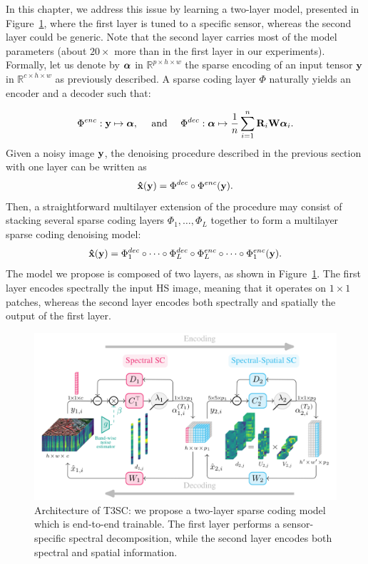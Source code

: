 In this chapter, we address this issue by learning a two-layer model, presented in Figure~\ref{fig:architecture}, where the first layer is tuned to a specific sensor, whereas the second layer could be generic. 
Note that the second layer carries most of the model parameters (about $20\times$ more than in the first layer in our experiments). 
Formally, let us denote by $ {\boldsymbol \alpha}$ in $\mathbb{R}^{p \times h \times w}$ the sparse encoding of an input tensor $\mathbf{y}$ in $\mathbb{R}^{c \times h \times w}$ as previously described.
A sparse coding layer $ \Phi $ naturally yields an encoder and a decoder such that:

\begin{equation}
\Phi^{enc} : \mathbf{y}       \mapsto \mathbf{\boldsymbol \alpha}, ~~~~\text{and}~~~~                  
\Phi^{dec} : \mathbf{\boldsymbol \alpha}  \mapsto \frac{1}{n} \sum_{i=1}^{n} \mathbf{R}_i \mathbf{W} \mathbf{\boldsymbol \alpha}_i. 
\end{equation}
Given a noisy image $\mathbf y$, the denoising procedure described in the previous section with one layer can be written as 
$$ \mathbf{ \hat{x} }(\mathbf y) = \Phi^{dec} \circ \Phi^{enc}( \mathbf{y} ). $$
Then, a straightforward multilayer extension of the procedure may consist of stacking several sparse coding layers $\Phi_1, \ldots, \Phi_L$ together to form a multilayer sparse coding denoising model:
$$ \mathbf{ \hat{x} }(\mathbf y) = \Phi_1^{dec} \circ \cdots \circ \Phi_L^{dec} \circ \Phi_L^{enc} \circ \cdots \circ \Phi_1^{enc}( \mathbf{ y } ).$$
The model we propose is composed of two layers, as shown in Figure~\ref{fig:architecture}.
The first layer encodes spectrally the input HS image, meaning that it operates on $1 \times 1$ patches, whereas the second layer encodes both spectrally and spatially the output of the first layer.

\begin{figure}
\centering
\includegraphics[width=\textwidth]{fichiers_latex/Chap1/T3SC.pdf}
\caption{Architecture of T3SC: we propose a two-layer sparse coding model which is end-to-end trainable.
The first layer performs a sensor-specific spectral decomposition, while the second layer encodes both spectral and spatial information.}
\label{fig:architecture}
\end{figure}


